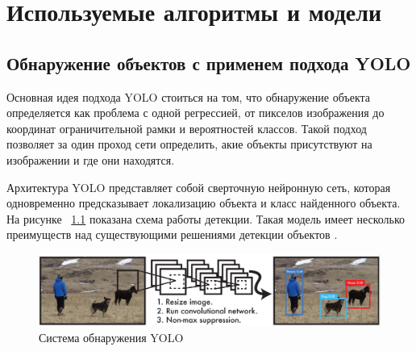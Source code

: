\documentclass[a4paper,english,russian]{G2-105}
\begin{document}
\chapter{Используемые алгоритмы и модели} \ttl \ttl
\section{Обнаружение объектов с применем подхода YOLO} \ttl 
\par Основная идея подхода YOLO стоиться на том, что обнаружение объекта определяется как проблема с одной регрессией, от пикселов изображения до координат ограничительной рамки и вероятностей классов. Такой подход позволяет за один проход сети определить, акие объекты присутствуют на изображении и где они находятся.
\par Архитектура YOLO представляет собой сверточную нейронную сеть, которая одновременно предсказывает локализацию объекта и класс найденного объекта. На рисунке ~\ref{yolo} показана схема работы детекции. Такая модель имеет несколько преимуществ над существующими решениями детекции объектов \cite{16}.
\begin{figure}
    \includegraphics[width=\linewidth]{yolo.png}
    \caption{Система обнаружения YOLO}
	\label{yolo}
\end{figure}
\ttl
\end{document}
